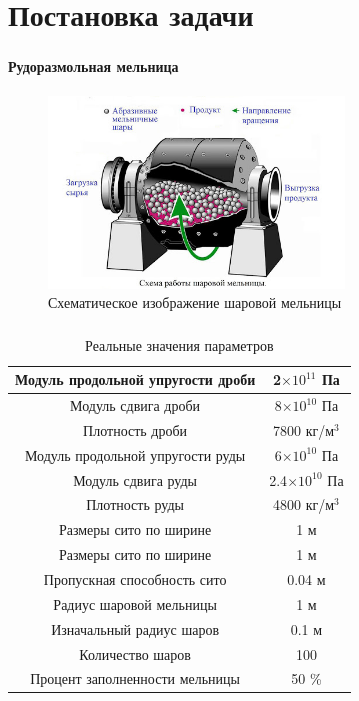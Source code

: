 \documentclass[c]{beamer}  %
\begin{document}
\section{Постановка задачи}


\begin{frame}
\frametitle{\insertsection}
\framesubtitle{Рудоразмольная мельница}
\begin{figure}[H]
	\centering
	\includegraphics[width=0.7\textwidth]{mill_nice} 
	\caption{Схематическое изображение шаровой мельницы}
	\label{pic:mill_end}
\end{figure} 

\end{frame}



\begin{frame}
\frametitle{\insertsection} 
\framesubtitle{\insertsubsection}

\begin{table}[H]
\caption{Реальные значения параметров}
\begin{tabular}{|c|c|}
\hline
Модуль продольной упругости дроби & 2$\times 10^{11}$ Па  \\ 
\hline
Модуль сдвига дроби & 8$\times 10^{10}$ Па \\  
\hline
Плотность дроби & 7800 кг/м$^3$ \\
\hline
Модуль продольной упругости руды & 6$\times 10^{10}$ Па  \\ 
\hline
Модуль сдвига руды & 2.4$\times 10^{10}$ Па \\  
\hline
Плотность руды & 4800 кг/м$^3$ \\
\hline
Размеры сито по ширине & 1 м \\
\hline
Размеры сито по ширине & 1 м \\
\hline
Пропускная способность сито & 0.04 м \\
\hline
Радиус шаровой мельницы & 1 м \\
\hline
Изначальный радиус шаров & 0.1 м \\
\hline
Количество шаров & 100 \\
\hline
Процент заполненности мельницы & 50 \% \\
\hline
\end{tabular}
\end{table}
\end{frame}
\end{document}
